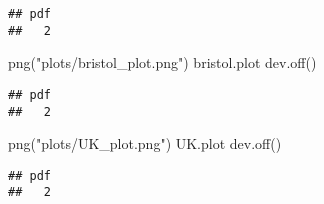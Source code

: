 \documentclass[
]{article}
\newenvironment{Shaded}{\begin{snugshade}}{\end{snugshade}}
\newcommand{\FunctionTok}[1]{\textcolor[rgb]{0.00,0.00,0.00}{#1}}
\newcommand{\NormalTok}[1]{#1}
\newcommand{\StringTok}[1]{\textcolor[rgb]{0.31,0.60,0.02}{#1}}
\begin{document}
\begin{verbatim}
## pdf 
##   2
\end{verbatim}

\begin{Shaded}
\begin{Highlighting}[]
\FunctionTok{png}\NormalTok{(}\StringTok{"plots/bristol\_plot.png"}\NormalTok{)}
\NormalTok{bristol.plot}
\FunctionTok{dev.off}\NormalTok{()}
\end{Highlighting}
\end{Shaded}

\begin{verbatim}
## pdf 
##   2
\end{verbatim}

\begin{Shaded}
\begin{Highlighting}[]
\FunctionTok{png}\NormalTok{(}\StringTok{"plots/UK\_plot.png"}\NormalTok{)}
\NormalTok{UK.plot}
\FunctionTok{dev.off}\NormalTok{()}
\end{Highlighting}
\end{Shaded}

\begin{verbatim}
## pdf 
##   2
\end{verbatim}
\end{document}
